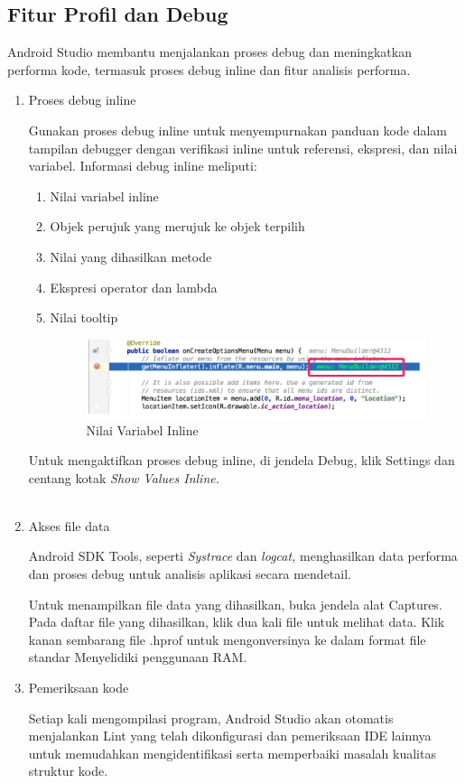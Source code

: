 \subsection{Fitur Profil dan Debug}
Android Studio membantu menjalankan proses debug dan meningkatkan performa kode, termasuk proses debug inline dan fitur analisis performa.
\begin{enumerate}
    \item Proses debug inline
    \par Gunakan proses debug inline untuk menyempurnakan panduan kode  dalam tampilan debugger dengan verifikasi inline untuk referensi, ekspresi, dan nilai variabel. Informasi debug inline meliputi:
    \begin{enumerate}
        \item Nilai variabel inline
        \item Objek perujuk yang merujuk ke objek terpilih
        \item Nilai yang dihasilkan metode
        \item Ekspresi operator dan lambda
        \item Nilai tooltip
    \begin{figure}[H]
    \centering
    \includegraphics[width=1\textwidth]{figures/android10.png}
    \caption{Nilai Variabel Inline}
    \label{print}
    \end{figure}
    \end{enumerate}
    \par Untuk mengaktifkan proses debug inline, di jendela Debug, klik Settings dan centang kotak \textit{Show Values Inline.}\\
    \\
    \item Akses file data
    \par Android SDK Tools, seperti\textit{ Systrace} dan \textit{logcat,} menghasilkan data performa dan proses debug untuk analisis aplikasi secara mendetail.

    \par Untuk menampilkan file data yang dihasilkan, buka jendela alat Captures. Pada daftar file yang dihasilkan, klik dua kali file untuk melihat data. Klik kanan sembarang file .hprof untuk mengonversinya ke dalam format file standar Menyelidiki penggunaan RAM.
    \item Pemeriksaan kode
    \par Setiap kali  mengompilasi program, Android Studio akan otomatis menjalankan Lint yang telah dikonfigurasi dan pemeriksaan IDE lainnya untuk memudahkan mengidentifikasi serta memperbaiki masalah kualitas struktur kode.


\end{enumerate}
